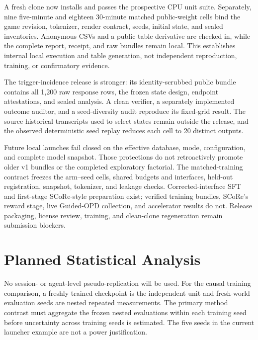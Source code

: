 \documentclass[11pt,a4paper]{article}
\begin{document}
A fresh clone now installs and passes the prospective CPU unit suite. Separately,
nine five-minute and eighteen 30-minute matched public-weight cells bind the
game revision, tokenizer, render contract, seeds, initial state, and sealed
inventories. Anonymous CSVs and a public table derivative are checked in, while
the complete report, receipt, and raw bundles remain local. This establishes
internal local execution and table generation, not independent reproduction,
training, or confirmatory evidence.

The trigger-incidence release is stronger: its identity-scrubbed public bundle
contains all 1,200 raw response rows, the frozen state design, endpoint
attestations, and sealed analysis. A clean verifier, a separately implemented
outcome auditor, and a seed-diversity audit reproduce its fixed-grid result.
The source historical transcripts used to select states remain outside the
release, and the observed deterministic seed replay reduces each cell to 20
distinct outputs.

Future local launches fail closed on the effective database, mode, configuration,
and complete model snapshot. Those protections do not retroactively promote
older v1 bundles or the completed exploratory factorial. The matched-training
contract freezes the arm--seed cells, shared budgets and interfaces, held-out
registration, snapshot, tokenizer, and leakage checks. Corrected-interface SFT
and first-stage SCoRe-style preparation exist; verified training bundles,
SCoRe's reward stage, live Guided-OPD collection, and accelerator results do
not. Release packaging, license review, training, and clean-clone regeneration
remain submission blockers.

\section{Planned Statistical Analysis}

No session- or agent-level pseudo-replication will be used. For the causal
training comparison, a freshly trained checkpoint is the independent unit and
fresh-world evaluation seeds are nested repeated measurements. The primary
method contrast must aggregate the frozen nested evaluations within each
training seed before uncertainty across training seeds is estimated. The five
seeds in the current launcher example are not a power justification.
\end{document}
